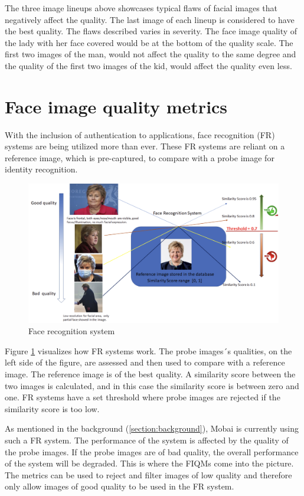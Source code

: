 The three image lineups above showcases typical flaws of facial images that negatively affect the quality. The last image of each lineup is considered to have the best quality. The flaws described varies in severity. The face image quality of the lady with her face covered would be at the bottom of the quality scale. The first two images of the man, would not affect the quality to the same degree and the quality of the first two images of the kid, would affect the quality even less. 
\newpage

\section{Face image quality metrics} 
With the inclusion of authentication to applications, face recognition (FR) systems are being utilized more than ever. These FR systems are reliant on a reference image, which is pre-captured, to compare with a probe image for identity recognition. 

\begin{figure}[h]
    \centering
    \includegraphics[scale = 0.45]{figures/Erna.png}
    \caption{Face recognition system}
    \label{fig:erna}
\end{figure}

Figure \ref{fig:erna} visualizes how FR systems work. The probe images´s qualities, on the left side of the figure, are assessed and then used to compare with a reference image. The reference image is of the best quality. A similarity score between the two images is calculated, and in this case the similarity score is between zero and one. FR systems have a set threshold where probe images are rejected if the similarity score is too low. 

As mentioned in the background (\ref{section:background}), Mobai is currently using such a FR system. The performance of the system is affected by the quality of the probe images. If the probe images are of bad quality, the overall performance of the system will be degraded. This is where the FIQMs come into the picture. The metrics can be used to reject and filter images of low quality and therefore only allow images of good quality to be used in the FR system. 
\newpage

